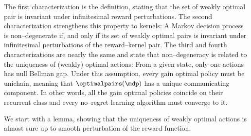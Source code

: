 \documentclass[preprint,cleveref,12pt]{colt2025}
\def\model{\mdp}
\def\optpairs{\optimalpairs}
\begin{document}
    The first characterization is the definition, stating that the set of weakly optimal pair is invariant under infinitesimal reward perturbations.
    The second characterization strengthens this property to kernels: A Markov decision process is non--degenerate if, and only if its set of weakly optimal pairs is invariant under infinitesimal perturbations of the reward--kernel pair. 
    The third and fourth characterizations are nearly the same and state that non--degeneracy is related to the uniqueness of (weakly) optimal actions: From a given state, only one actions has null Bellman gap. 
    Under this assumption, every gain optimal policy must be unichain, meaning that $\optpairs(\model)$ has a unique communicating component.
    In other words, all the gain optimal policies coincide on their recurrent class and every no--regret learning algorithm must converge to it. 

    We start with a lemma, showing that the uniqueness of weakly optimal actions is almost sure up to smooth perturbation of the reward function. 
\end{document}
